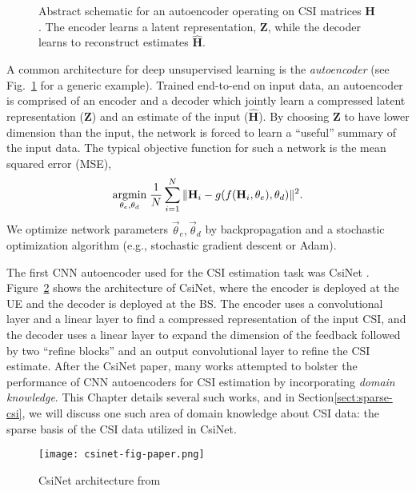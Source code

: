 \begin{figure}[!hbtp]
\centering
\def\svgwidth{0.8\columnwidth}

\caption{Abstract schematic for an autoencoder operating on CSI matrices $\mathbf H$. The encoder learns a latent representation, $\mathbf Z$, while the decoder learns to reconstruct estimates $\hat{\mathbf H}$.}
\label{fig:autoencoder_schematic}
\end{figure}

A common architecture for deep unsupervised learning is the \emph{autoencoder} (see Fig.~\ref{fig:autoencoder_schematic} for a generic example). Trained end-to-end on input data, an autoencoder is comprised of an encoder and a decoder which jointly learn a compressed latent representation ($\mathbf Z$) and an estimate of the input ($\hat{\mathbf H}$). By choosing $\mathbf Z$ to have lower dimension than the input, the network is forced to learn a ``useful'' summary of the input data. The typical objective function for such a network is the mean squared error (MSE),
\begin{align*}
\underset{\theta_e, \theta_d}{\text{argmin}}\; \frac 1N \sum_{i=1}^N\Arrowvert \mathbf H_i - g(f(\mathbf H_i, \theta_e), \theta_d) \Arrowvert^2.
\end{align*}
We optimize network parameters $\vec \theta_e, \vec \theta_d$ by backpropagation and a stochastic optimization algorithm (e.g., stochastic gradient descent or Adam).

The first CNN autoencoder used for the CSI estimation task was CsiNet \cite{ref:csinet}. Figure~\ref{fig:csinet} shows the architecture of CsiNet, where the encoder is deployed at the UE and the decoder is deployed at the BS. The encoder uses a convolutional layer and a linear layer to find a compressed representation of the input CSI, and the decoder uses a linear layer to expand the dimension of the feedback followed by two ``refine blocks'' and an output convolutional layer to refine the CSI estimate. After the CsiNet paper, many works attempted to bolster the performance of CNN autoencoders for CSI estimation by incorporating \emph{domain knowledge}. This Chapter details several such works, and in Section\ref{sect:sparse-csi}, we will discuss one such area of domain knowledge about CSI data: the sparse basis of the CSI data utilized in CsiNet. 

\begin{figure}[htb]
	\centering
	\texttt{[image: csinet-fig-paper.png]}
	\caption{CsiNet architecture from \cite{ref:csinet}}
	\label{fig:csinet}
\end{figure}

